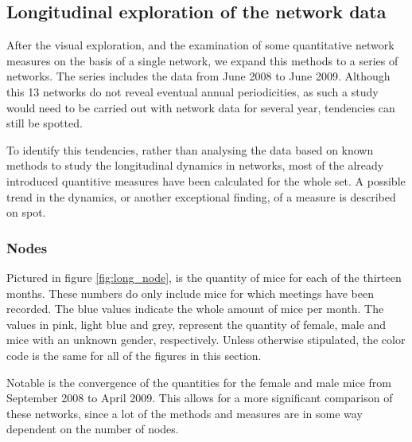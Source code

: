 \subsection{Longitudinal exploration of the network data}
\label{subsec:longitudinal}

After the visual exploration, and the examination of some quantitative network measures on the basis of a single network, we expand this methods to a series of networks. The series includes the data from June 2008 to June 2009. Although this 13 networks do not reveal eventual annual periodicities, as such a study would need to be carried out with network data for several year, tendencies can still be spotted.
 
To identify this tendencies, rather than analysing the data based on known methods to study the longitudinal dynamics in networks\citep{snijders:05}, most of the already introduced quantitive measures have been calculated for the whole set. A possible trend in the dynamics, or another exceptional finding, of a measure is described on spot.

\subsubsection{Nodes}

Pictured in figure \ref{fig:long_node}, is the quantity of mice for each of the thirteen months. These numbers do only include mice for which meetings have been recorded. The blue values indicate the whole amount of mice per month. The values in pink, light blue and grey, represent the quantity of female, male and mice with an unknown gender, respectively. Unless otherwise stipulated, the color code is the same for all of the figures in this section.

Notable is the convergence of the quantities for the female and male mice from September 2008 to April 2009. This allows for a more significant comparison of these networks, since a lot of the methods and measures are in some way dependent on the number of nodes.  

